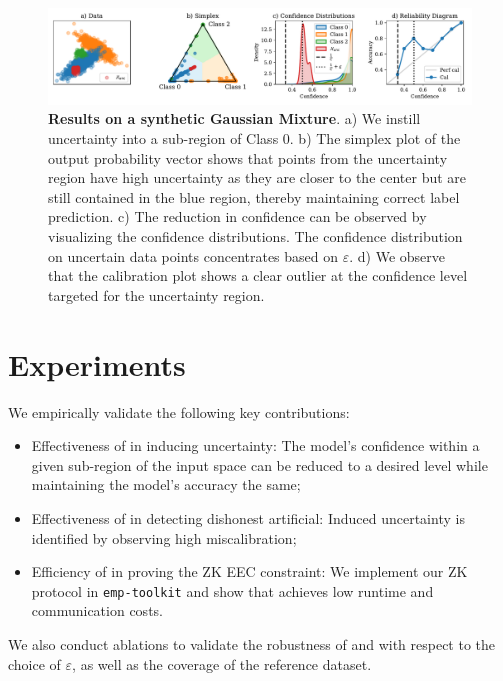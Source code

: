 \begin{figure}[t]
    \centering
    \includegraphics[width=\linewidth]{figs/confidential_guardian/gauss_res.pdf}
    \caption[Results on a synthetic Gaussian Mixture.]{\textbf{Results on a synthetic Gaussian Mixture}. a) We instill uncertainty into a sub-region of Class 0. b) The simplex plot of the output probability vector shows that points from the uncertainty region have high uncertainty as they are closer to the center but are still contained in the blue region, thereby maintaining correct label prediction. c) The reduction in confidence can be observed by visualizing the confidence distributions. The confidence distribution on uncertain data points concentrates based on $\varepsilon$. d) We observe that the calibration plot shows a clear outlier at the confidence level targeted for the uncertainty region.}
    \label{fig:gaussian}
\end{figure}

\section{Experiments}

We empirically validate the following key contributions:
\begin{itemize}
    \item Effectiveness of \attack in inducing uncertainty: The model's confidence within a given sub-region of the input space can be reduced to a desired level while maintaining the model's accuracy the same; 
    \item Effectiveness of \name in detecting dishonest artificial: Induced uncertainty is identified by observing high miscalibration; 
    \item Efficiency of \name in proving the ZK EEC constraint: We implement our ZK protocol in \texttt{emp-toolkit} and show that \name achieves low runtime and communication costs.    
\end{itemize}
We also conduct ablations to validate the robustness of \attack and \name with respect to the choice of $\varepsilon$, as well as the coverage of the reference dataset.  

